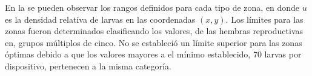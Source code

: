 En la  se pueden observar los rangos definidos para cada tipo de
zona, en donde $u$ es la densidad relativa de larvas en las coordenadas $(x,y)$. Los límites para
las zonas fueron determinados clasificando los valores, de las hembras reproductivas en, grupos
múltiplos de cinco. No se estableció un límite superior para las zonas óptimas debido a que los
valores mayores a el mínimo establecido, 70 larvas por dispositivo, pertenecen a la misma categoría.
